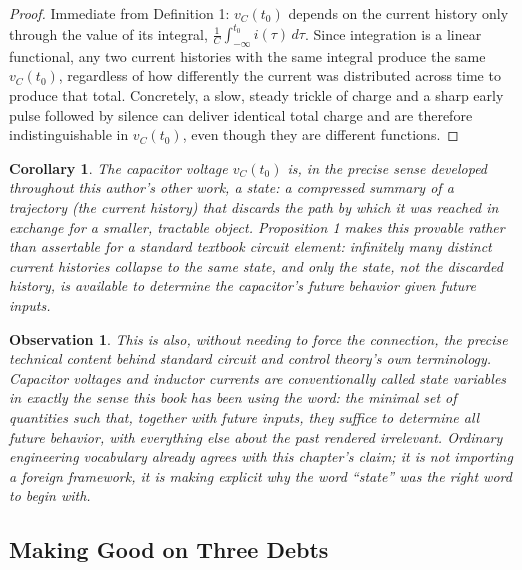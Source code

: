 \documentclass[12pt]{article}
\newtheorem{corollary}{Corollary}
\newtheorem{observation}{Observation}
\begin{document}
\begin{proof}
Immediate from Definition 1: $v_C(t_0)$ depends on the current history only through the value of its integral, $\frac{1}{C}\int_{-\infty}^{t_0} i(\tau)\,d\tau$. Since integration is a linear functional, any two current histories with the same integral produce the same $v_C(t_0)$, regardless of how differently the current was distributed across time to produce that total. Concretely, a slow, steady trickle of charge and a sharp early pulse followed by silence can deliver identical total charge and are therefore indistinguishable in $v_C(t_0)$, even though they are different functions.
\end{proof}

\begin{corollary}
The capacitor voltage $v_C(t_0)$ is, in the precise sense developed throughout this author's other work, a state: a compressed summary of a trajectory (the current history) that discards the path by which it was reached in exchange for a smaller, tractable object. Proposition 1 makes this provable rather than assertable for a standard textbook circuit element: infinitely many distinct current histories collapse to the same state, and only the state, not the discarded history, is available to determine the capacitor's future behavior given future inputs.
\end{corollary}

\begin{observation}
This is also, without needing to force the connection, the precise technical content behind standard circuit and control theory's own terminology. Capacitor voltages and inductor currents are conventionally called \emph{state variables} in exactly the sense this book has been using the word: the minimal set of quantities such that, together with future inputs, they suffice to determine all future behavior, with everything else about the past rendered irrelevant. Ordinary engineering vocabulary already agrees with this chapter's claim; it is not importing a foreign framework, it is making explicit why the word ``state'' was the right word to begin with.
\end{observation}

\subsection*{Making Good on Three Debts}
\end{document}
